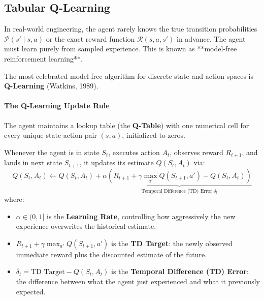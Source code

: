 \subsection{Tabular Q-Learning}\label{subsec:q_learning}

In real-world engineering, the agent rarely knows the true transition probabilities $\mathcal{P}(s' \mid s, a)$ or the exact reward function $\mathcal{R}(s, a, s')$ in advance. The agent must learn purely from sampled experience. This is known as **model-free reinforcement learning**.

The most celebrated model-free algorithm for discrete state and action spaces is \textbf{Q-Learning} (Watkins, 1989).

\paragraph{The Q-Learning Update Rule}
The agent maintains a lookup table (the \textbf{Q-Table}) with one numerical cell for every unique state-action pair $(s, a)$, initialized to zeros. 

Whenever the agent is in state $S_t$, executes action $A_t$, observes reward $R_{t+1}$, and lands in next state $S_{t+1}$, it updates its estimate $Q(S_t, A_t)$ via:
\begin{equation}
Q(S_t, A_t) \leftarrow Q(S_t, A_t) + \alpha \underbrace{\left( R_{t+1} + \gamma \max_{a'} Q(S_{t+1}, a') - Q(S_t, A_t) \right)}_{\text{Temporal Difference (TD) Error } \delta_t}\label{eq:q_learning_update}
\end{equation}
where:
\begin{itemize}
    \item $\alpha \in (0, 1]$ is the \textbf{Learning Rate}, controlling how aggressively the new experience overwrites the historical estimate.
    \item $R_{t+1} + \gamma \max_{a'} Q(S_{t+1}, a')$ is the \textbf{TD Target}: the newly observed immediate reward plus the discounted estimate of the future.
    \item $\delta_t = \text{TD Target} - Q(S_t, A_t)$ is the \textbf{Temporal Difference (TD) Error}: the difference between what the agent just experienced and what it previously expected.
\end{itemize}

